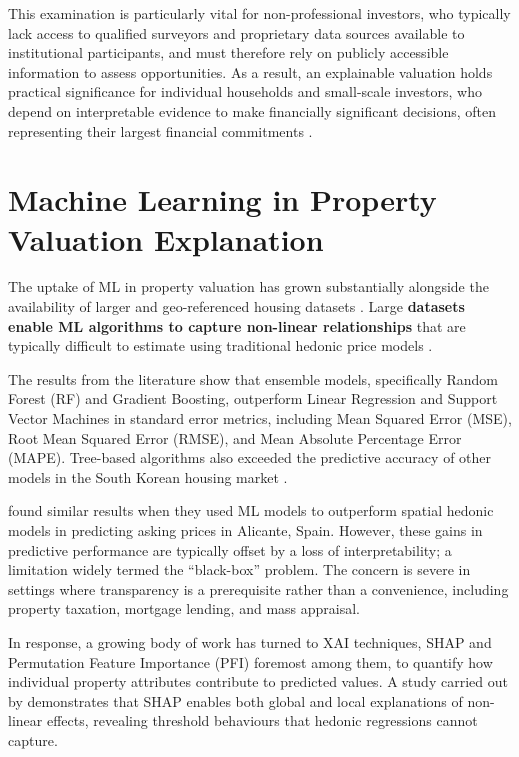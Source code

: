 This examination is particularly vital for non-professional investors, who typically lack access to qualified surveyors and proprietary data sources available to institutional participants, and must therefore rely on publicly accessible information to assess opportunities.
As a result, an explainable valuation holds practical significance for individual households and small-scale investors, who depend on interpretable evidence to make financially significant decisions, often representing their largest financial commitments \parencite{Rinaudo2025}.


\section{Machine Learning in Property Valuation Explanation
\label{se:MLBackground}}

The uptake of ML in property valuation has grown substantially alongside the availability of larger and geo-referenced housing datasets \parencite{Kang2021}. Large \textbf{datasets enable ML algorithms to capture non-linear relationships} that are typically difficult to estimate using traditional hedonic price models \parencite{Ho2020}.

The results from the literature show that ensemble models, specifically Random Forest (RF) and Gradient Boosting, outperform Linear Regression and Support Vector Machines in standard error metrics, including Mean Squared Error (MSE), Root Mean Squared Error (RMSE), and Mean Absolute Percentage Error (MAPE). Tree-based algorithms also exceeded the predictive accuracy of other models in the South Korean housing market  \parencite{Hong2020}. 

\textcite{Rico-Juan2021} found similar results when they used ML models to outperform spatial hedonic models in predicting asking prices in Alicante, Spain. However, these gains in predictive performance are typically offset by a loss of interpretability; a limitation widely termed the ``black-box'' problem. The concern is severe in settings where transparency is a prerequisite rather than a convenience, including property taxation, mortgage lending, and mass appraisal. 

In response, a growing body of work has turned to XAI techniques, SHAP and Permutation Feature Importance (PFI) foremost among them, to quantify how individual property attributes contribute to predicted values. A study carried out by \textcite{Kim2025} demonstrates that SHAP enables both global and local explanations of non-linear effects, revealing threshold behaviours that hedonic regressions cannot capture.


